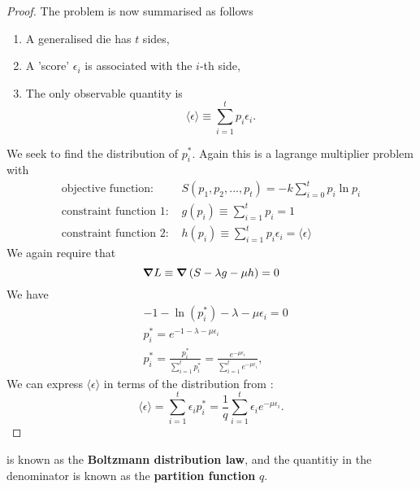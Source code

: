 \begin{proof}
The problem is now summarised as follows
\begin{enumerate}
\item A generalised die has $t$ sides, 
\item A 'score' $\epsilon_i$ is associated with the $i$-th side, 
\item The only observable quantity is 
	\begin{equation}
	\langle\epsilon\rangle\equiv\sum^t_{i=1}p_i\epsilon_i. 
	\end{equation}
\end{enumerate}
We seek to find the distribution of $p_i^*$. Again this is a lagrange multiplier problem with 
\begin{subequations}
\begin{align}
\text{objective function:\ }&S(p_1,p_2,...,p_t)=-k\sum_{i=0}^t p_i\ln{p_i} \\
\text{constraint function 1:\ }&g(p_i)\equiv\sum^t_{i=1}p_i=1 \label{lag_unity}\\
\text{constraint function 2:\ }&h(p_i)\equiv\sum^t_{i=1}p_i\epsilon_i=\langle\epsilon\rangle \label{lag_exp}
\end{align}
\end{subequations}
We again require that
\begin{equation}
\nab L\equiv\nab\left(S-\lambda g-\mu h\right)=0
\end{equation}
We have
\begin{subequations}
\begin{align}
&-1-\ln(p_i^*)-\lambda-\mu\epsilon_i=0 \\
&p^*_i=e^{-1-\lambda-\mu\epsilon_i} \\
&p_i^*=\frac{p_i^*}{\sum_{i=1}^t p_i^*}=\frac{e^{-\mu\epsilon_i}}{\sum_{i=1}^t e^{-\mu\epsilon_i}}\label{boltzmann}, 
\end{align}
\end{subequations}
We can express $\langle\epsilon\rangle$ in terms of the distribution from : 
\begin{equation}
\label{boltz_exp}
\langle\epsilon\rangle=\sum^t_{i=1}\epsilon_ip^*_i=\frac{1}{q}\sum^t_{i=1}\epsilon_ie^{-\mu\epsilon_i}. 
\end{equation}
\end{proof}

\begin{defi}
 is known as the \textbf{Boltzmann distribution law}, and the quantitiy in the denominator is known as the \textbf{partition function} $q$. 
\end{defi}

